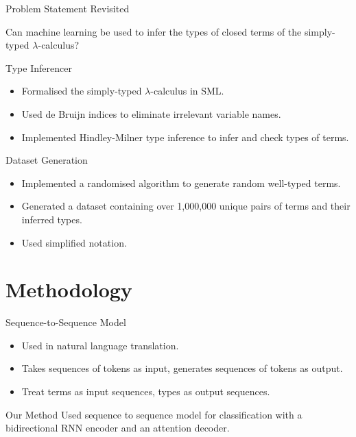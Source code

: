 \documentclass[17pt]{beamer}
\begin{document}
\begin{frame}{Problem Statement Revisited}
  \begin{center}
    Can machine learning be used to infer the types of closed terms of
    the simply-typed $\lambda$-calculus?
  \end{center}
\end{frame}

\begin{frame}{Type Inferencer}
  \begin{itemize}
  \item Formalised the simply-typed $\lambda$-calculus in SML.
  \item Used de Bruijn indices to eliminate irrelevant variable names.
  \item Implemented Hindley-Milner type inference to infer and check
    types of terms.
  \end{itemize}
\end{frame}

\begin{frame}{Dataset Generation}
  \begin{itemize}
  \item Implemented a randomised algorithm to generate random
    well-typed terms.
  \item Generated a dataset containing over 1,000,000 unique pairs of
    terms and their inferred types.
  \item Used simplified notation.
  \end{itemize}
\end{frame}

\section{Methodology}

\begin{frame}{Sequence-to-Sequence Model}
  \begin{itemize}
  \item Used in natural language translation.
  \item Takes sequences of tokens as input, generates sequences of
    tokens as output.
  \item Treat terms as input sequences, types as output sequences.
  \end{itemize}
\end{frame}

\begin{frame}{Our Method}
  Used sequence to sequence model for classification with
  a bidirectional RNN encoder and an attention decoder.
\end{frame}
\end{document}
